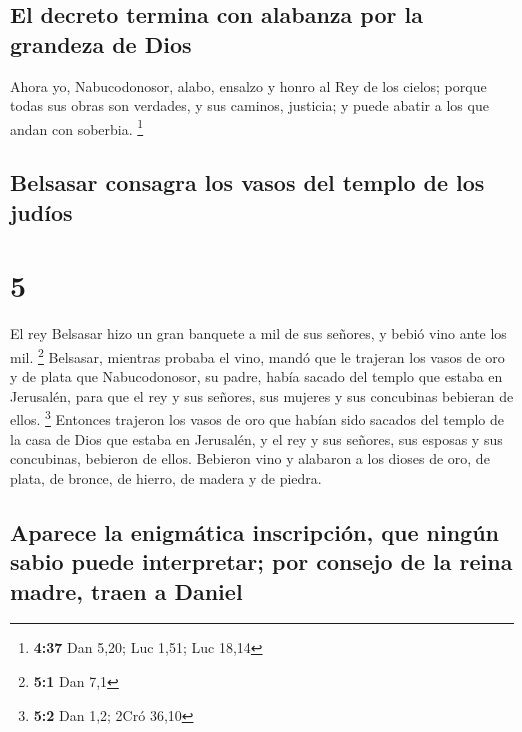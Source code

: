 \hypertarget{el-decreto-termina-con-alabanza-por-la-grandeza-de-dios}{%
\subsection{El decreto termina con alabanza por la grandeza de
Dios}\label{el-decreto-termina-con-alabanza-por-la-grandeza-de-dios}}

 Ahora yo, Nabucodonosor, alabo, ensalzo y honro al Rey
de los cielos; porque todas sus obras son verdades, y sus caminos,
justicia; y puede abatir a los que andan con soberbia. \footnote{\textbf{4:37}
  Dan 5,20; Luc 1,51; Luc 18,14}

\hypertarget{belsasar-consagra-los-vasos-del-templo-de-los-juduxedos}{%
\subsection{Belsasar consagra los vasos del templo de los
judíos}\label{belsasar-consagra-los-vasos-del-templo-de-los-juduxedos}}

\hypertarget{section-4}{%
\section{5}\label{section-4}}

 El rey Belsasar hizo un gran banquete a mil de sus
señores, y bebió vino ante los mil. \footnote{\textbf{5:1} Dan 7,1}
 Belsasar, mientras probaba el vino, mandó que le trajeran
los vasos de oro y de plata que Nabucodonosor, su padre, había sacado
del templo que estaba en Jerusalén, para que el rey y sus señores, sus
mujeres y sus concubinas bebieran de ellos. \footnote{\textbf{5:2} Dan
  1,2; 2Cró 36,10}  Entonces trajeron los vasos de oro que
habían sido sacados del templo de la casa de Dios que estaba en
Jerusalén, y el rey y sus señores, sus esposas y sus concubinas,
bebieron de ellos.  Bebieron vino y alabaron a los dioses
de oro, de plata, de bronce, de hierro, de madera y de piedra.

\hypertarget{aparece-la-enigmuxe1tica-inscripciuxf3n-que-ninguxfan-sabio-puede-interpretar-por-consejo-de-la-reina-madre-traen-a-daniel}{%
\subsection{Aparece la enigmática inscripción, que ningún sabio puede
interpretar; por consejo de la reina madre, traen a
Daniel}\label{aparece-la-enigmuxe1tica-inscripciuxf3n-que-ninguxfan-sabio-puede-interpretar-por-consejo-de-la-reina-madre-traen-a-daniel}}

